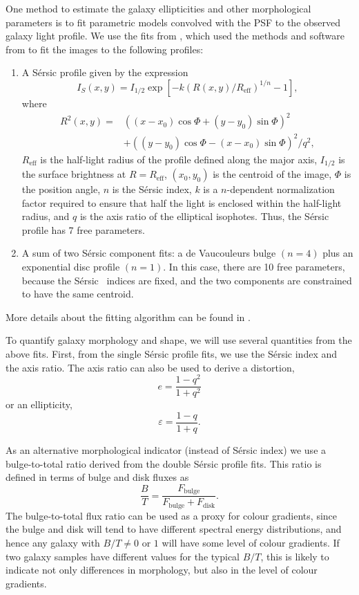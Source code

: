 \documentclass[twocolumn,useAMS,usenatbib]{mn2e}
\newcommand{\sersic}{S\'{e}rsic }
\begin{document}
One method to estimate the galaxy ellipticities and other
morphological parameters is to fit parametric models convolved with
the PSF to the observed galaxy light profile.  We use the fits from
\cite{great3}, which used the methods and
software from \cite{Claire_Fits} to fit the images to the following profiles:
\begin{enumerate}
 \item A \sersic profile given by the expression 
       \begin{equation} 
    I_S(x,y) = I_{1/2}\exp{\left[ -k(R(x,y)/R_{\text{eff}})^{1/n} -1 \right]},
       \end{equation}
where \begin{align*} R^2(x,y) = & ((x-x_0)\cos\Phi+(y-y_0)\sin\Phi)^2
  \\ & + ((y-y_0)\cos\Phi-(x-x_0)\sin\Phi)^2/q^2, \end{align*}
$R_{\text{eff}}$ is the half-light radius of the profile defined along
the major axis, $I_{1/2}$ is the surface brightness at $R=R_{\text{eff}}$, $(x_0,y_0)$ is the centroid of the image,
$\Phi$ is the position angle, $n$ is the \sersic index, $k$ is a
$n$-dependent normalization factor required to ensure that half the
light is enclosed within the half-light radius, and $q$ is the axis
ratio of the elliptical isophotes.
Thus, the \sersic profile has 7 free parameters.
       \item A sum of two \sersic component fits: a de Vaucouleurs
         bulge $(n=4)$ plus an exponential disc profile $(n=1)$.  In this
         case, there are 10 free parameters, because the \sersic\
         indices are fixed, and the two components are constrained to
         have the same centroid.
\end{enumerate}
More details about the fitting algorithm can be found
in \cite{Claire_Fits}.

To quantify galaxy morphology and shape, we will use several
quantities from the above fits.  First, from the single \sersic
profile fits, we use the \sersic index and the axis ratio.  The axis
ratio can also be used to derive a distortion,
\begin{equation}\label{eq:distortion}
e = \frac{1-q^2}{1+q^2}
\end{equation}
or an ellipticity,
\begin{equation}\label{eq:ellipticity}
\varepsilon = \frac{1-q}{1+q}.
\end{equation}

As an alternative morphological indicator (instead of \sersic index)
we use a bulge-to-total ratio derived from the double \sersic
profile fits.  This ratio is defined in terms of bulge and disk fluxes as
\begin{equation}
\frac{B}{T} = \frac{F_\text{bulge}}{F_\text{bulge}+F_\text{disk}}.
\end{equation}
The bulge-to-total flux ratio can be used as a proxy for
  colour gradients, since the bulge and disk will tend to have
  different spectral energy distributions, and hence any galaxy with
  $B/T\ne 0$ or $1$ will have some level of colour gradients.  If two
  galaxy samples have different values for the typical $B/T$, this is
  likely to indicate not only differences in morphology, but also in
  the level of colour gradients.
 
\end{document}

